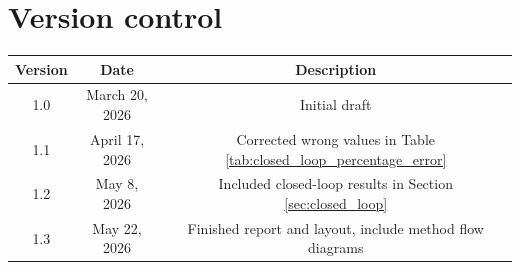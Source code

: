 \documentclass[12pt,a4paper]{article}
\begin{document}
\newpage
\section*{Version control}

\begin{tabular}{|c|c|c|}
\hline
Version & Date & Description \\
\hline
1.0 & March 20, 2026 & Initial draft \\
\hline
1.1 & April 17, 2026 & Corrected wrong values in Table \ref{tab:closed_loop_percentage_error} \\
\hline 
1.2 & May 8, 2026 & Included closed-loop results in Section \ref{sec:closed_loop} \\
\hline
1.3 & May 22, 2026 & Finished report and layout, include method flow diagrams \\
\hline
\end{tabular}
\end{document}
